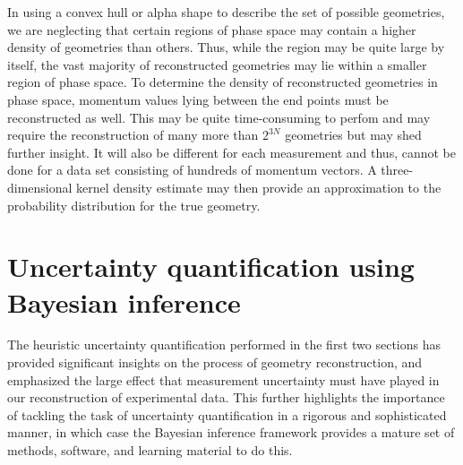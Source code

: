 In using a convex hull or alpha shape to describe the set of possible geometries, we are neglecting that certain regions of phase space may contain a higher density of geometries than others. Thus, while the region may be quite large by itself, the vast majority of reconstructed geometries may lie within a smaller region of phase space. To determine the density of reconstructed geometries in phase space, momentum values lying between the end points must be reconstructed as well. This may be quite time-consuming to perfom and may require the reconstruction of many more than $2^{3N}$ geometries but may shed further insight. It will also be different for each measurement and thus, cannot be done for a data set consisting of hundreds of momentum vectors. A three-dimensional kernel density estimate may then provide an approximation to the probability distribution for the true geometry.


\section{Uncertainty quantification using Bayesian inference} \label{sec:uncertaintyBayesian}
The heuristic uncertainty quantification performed in the first two sections has provided significant insights on the process of geometry reconstruction, and emphasized the large effect that measurement uncertainty must have played in our reconstruction of experimental data. This further highlights the importance of tackling the task of uncertainty quantification in a rigorous and sophisticated manner, in which case the Bayesian inference framework provides a mature set of methods, software, and learning material to do this.

